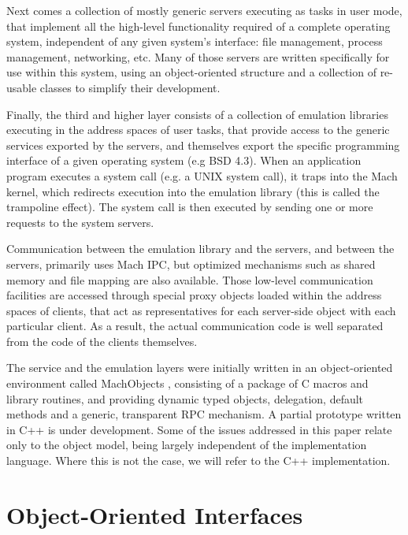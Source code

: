 Next comes a collection of mostly generic servers executing as tasks
in user mode, that implement all the high-level functionality required
of a complete operating system, independent of any given system's
interface: file management, process management, networking, etc. Many
of those servers are written specifically for use within this system,
using an object-oriented structure and a collection of re-usable
classes to simplify their development. 

Finally, the third and higher layer consists of a collection of
emulation libraries executing in the address spaces of user tasks,
that provide access to the generic services exported by the servers,
and themselves export the specific programming interface of a given
operating system (e.g BSD 4.3). When an application program executes a
system call (e.g. a UNIX system call), it traps into the Mach kernel,
which redirects execution into the emulation library (this is called
the trampoline effect). The system call is then executed by sending
one or more requests to the system servers.

Communication between the emulation library and the servers, and
between the servers, primarily uses Mach IPC, but optimized mechanisms
such as shared memory and file mapping are also available. Those
low-level communication facilities are accessed through special proxy
objects \cite{Sha86} loaded within the address spaces of clients, that act
as representatives for each server-side object with each particular
client. As a result, the actual communication code is well separated
from the code of the clients themselves.

The service and the emulation layers were initially written in an
object-oriented environment called MachObjects \cite{Jul89}, consisting of
a package of C macros and library routines, and providing dynamic
typed objects, delegation, default methods and a generic, transparent
RPC mechanism. A partial prototype written in C++ is under
development. Some of the issues addressed in this paper relate only to
the object model, being largely independent of the implementation
language. Where this is not the case, we will refer to the C++
implementation.

\section{Object-Oriented Interfaces}

